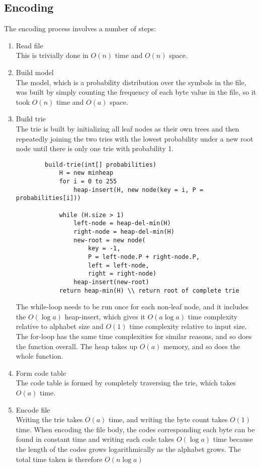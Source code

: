 \documentclass[11pt,a4paper,oneside,notitlepage,final]{article}
\begin{document}
	\subsection{Encoding}
	The encoding process involves a number of steps:
	\vspace{-0.8em}
	\begin{enumerate}
		\item Read file\\
		This is trivially done in $ O(n) $ time and $ O(n) $ space.
		\item Build model\\
		The model, which is a probability distribution over the symbols in the file, was built by simply counting the frequency of each byte value in the file, so it took $ O(n) $ time and $ O(a) $ space.
		\item Build trie\\
		The trie is built by initializing all leaf nodes as their own trees and then repeatedly joining the two tries with the lowest probability under a new root node until there is only one trie with probability 1.
		\begin{lstlisting}
		build-trie(int[] probabilities)
			H = new minheap
			for i = 0 to 255
				heap-insert(H, new node(key = i, P = probabilities[i]))
			
			while (H.size > 1)
				left-node = heap-del-min(H)
				right-node = heap-del-min(H)
				new-root = new node(
					key = -1,
					P = left-node.P + right-node.P,
					left = left-node,
					right = right-node)
				heap-insert(new-root)
			return heap-min(H) \\ return root of complete trie
		\end{lstlisting}
		The while-loop needs to be run once for each non-leaf node, and it includes the $ O(\log a) $ heap-insert, which gives it $ O(a \log a) $ time complexity relative to alphabet size and $ O(1) $ time complexity relative to input size. The for-loop has the same time complexities for similar reasons, and so does the function overall. The heap takes up $ O(a) $ memory, and so does the whole function.
		
		\item Form code table\\
		The code table is formed by completely traversing the trie, which takes $ O(a) $ time.
		
		\item Encode file\\
		Writing the trie takes $ O(a) $ time, and writing the byte count takes $ O(1) $ time.
		When encoding the file body, the codes corresponding each byte can be found in constant time and writing each code takes $ O(\log a) $ time because the length of the codes grows logarithmically as the alphabet grows. The total time taken is therefore $ O(n \log a) $
	\end{enumerate}
	
\end{document}
